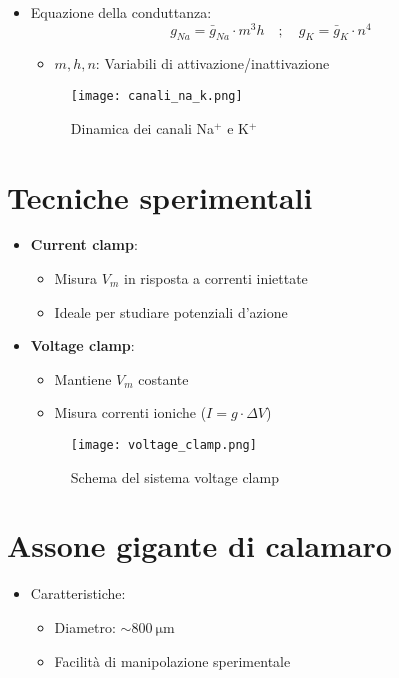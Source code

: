 \documentclass{article}
\begin{document}
\begin{itemize}
\begin{itemize}
\item Equazione della conduttanza:
\[
g_{Na} = \bar{g}_{Na} \cdot m^3 h \quad;\quad g_K = \bar{g}_K \cdot n^4
\]
\begin{itemize}
\item \(m, h, n\): Variabili di attivazione/inattivazione
\end{itemize}

\begin{figure}[h]
\centering
\texttt{[image: canali\_na\_k.png]}
\caption{Dinamica dei canali Na\(^+\) e K\(^+\)}
\label{fig:canali}
\end{figure}
\end{itemize}

\section{Tecniche sperimentali}
\begin{itemize}
\item \textbf{Current clamp}:
  \begin{itemize}
  \item Misura \(V_m\) in risposta a correnti iniettate
  \item Ideale per studiare potenziali d'azione
  \end{itemize}

\item \textbf{Voltage clamp}:
  \begin{itemize}
  \item Mantiene \(V_m\) costante
  \item Misura correnti ioniche (\(I = g \cdot \Delta V\))
  \end{itemize}

\begin{figure}[h]
\centering
\texttt{[image: voltage\_clamp.png]}
\caption{Schema del sistema voltage clamp}
\label{fig:clamp}
\end{figure}
\end{itemize}

\section{Assone gigante di calamaro}
\begin{itemize}
\item Caratteristiche: \begin{itemize}
  \item Diametro: \(\sim\SI{800}{\micro\meter}\)
  \item Facilità di manipolazione sperimentale
  \end{itemize}


\end{itemize}
\end{itemize}
\end{document}
